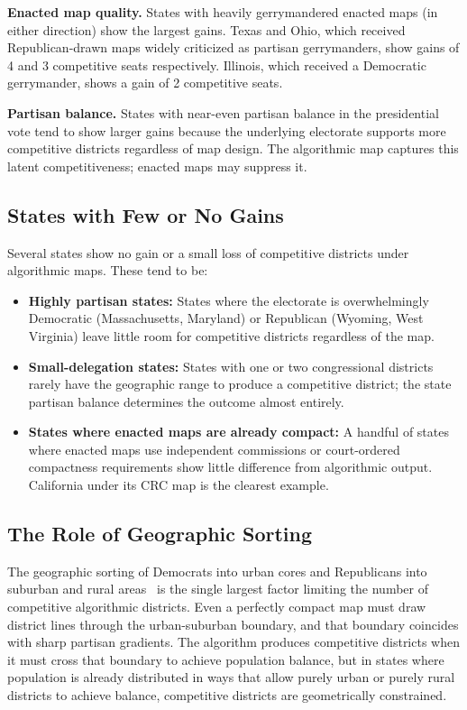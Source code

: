\textbf{Enacted map quality.}  States with heavily gerrymandered enacted
maps (in either direction) show the largest gains.  Texas and Ohio, which
received Republican-drawn maps widely criticized as partisan gerrymanders,
show gains of 4 and 3 competitive seats respectively.  Illinois, which
received a Democratic gerrymander, shows a gain of 2 competitive seats.

\textbf{Partisan balance.}  States with near-even partisan balance in the
presidential vote tend to show larger gains because the underlying electorate
supports more competitive districts regardless of map design.  The algorithmic
map captures this latent competitiveness; enacted maps may suppress it.

\subsection{States with Few or No Gains}

Several states show no gain or a small loss of competitive districts under
algorithmic maps.  These tend to be:
\begin{itemize}
  \item \textbf{Highly partisan states:} States where the electorate is
    overwhelmingly Democratic (Massachusetts, Maryland) or Republican
    (Wyoming, West Virginia) leave little room for competitive districts
    regardless of the map.
  \item \textbf{Small-delegation states:} States with one or two congressional
    districts rarely have the geographic range to produce a competitive
    district; the state partisan balance determines the outcome almost
    entirely.
  \item \textbf{States where enacted maps are already compact:} A handful of
    states where enacted maps use independent commissions or court-ordered
    compactness requirements show little difference from algorithmic output.
    California under its CRC map is the clearest example.
\end{itemize}

\subsection{The Role of Geographic Sorting}

The geographic sorting of Democrats into urban cores and Republicans into
suburban and rural areas~\citep{chen2013unintentional,rodden2019why} is the
single largest factor limiting the number of competitive algorithmic districts.
Even a perfectly compact map must draw district lines through the urban-suburban
boundary, and that boundary coincides with sharp partisan gradients.  The
algorithm produces competitive districts when it must cross that boundary to
achieve population balance, but in states where population is already
distributed in ways that allow purely urban or purely rural districts to achieve
balance, competitive districts are geometrically constrained.

